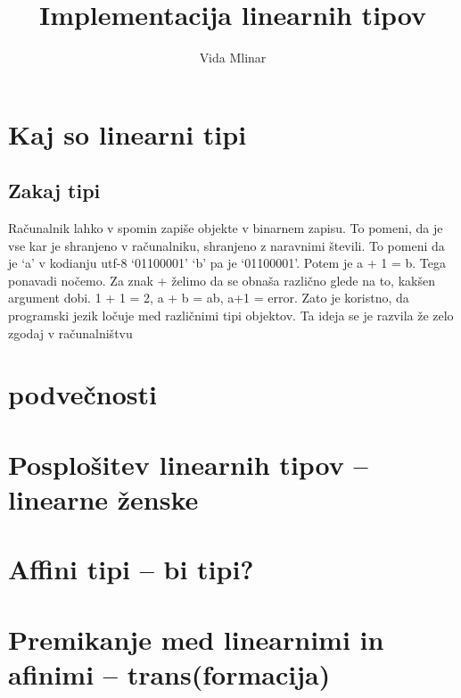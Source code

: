 \documentclass[12pt, titlepage, a4paper]{article}
\title{Implementacija linearnih tipov}
\author{Vida Mlinar}
\date{}
\begin{document}
    
\section{Kaj so linearni tipi}

\subsection{Zakaj tipi}
Računalnik lahko v spomin zapiše objekte v binarnem zapisu. To pomeni, da je vse kar je shranjeno v računalniku, shranjeno z naravnimi števili. To pomeni da je `a' v kodianju utf-8 `01100001' `b' pa je `01100001'. Potem je a + 1 = b. Tega ponavadi nočemo. Za znak + želimo da se obnaša različno glede na to, kakšen argument dobi. 1 + 1 = 2, a + b = ab, a+1 = error. Zato je koristno, da programski jezik ločuje med različnimi tipi objektov. Ta ideja se je razvila že zelo zgodaj v računalništvu

\section{podvečnosti}

\section{Posplošitev linearnih tipov -- linearne ženske}

\section{Affini tipi -- bi tipi?}

\section{Premikanje med linearnimi in afinimi -- trans(formacija)}
\end{document}
